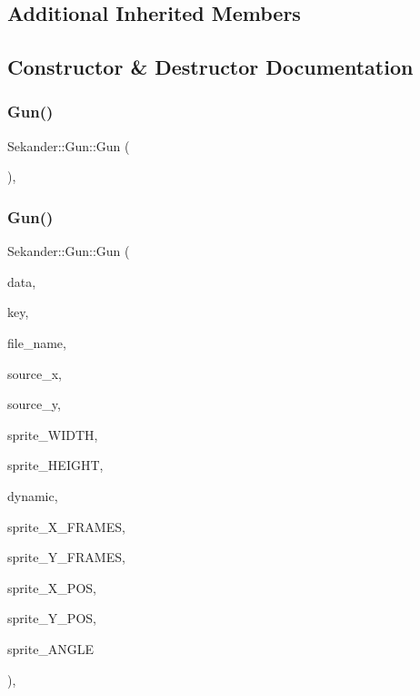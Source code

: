 \subsection*{Additional Inherited Members}


\subsection{Constructor \& Destructor Documentation}
\mbox{\label{classSekander_1_1Gun_a576c17046ba8d7bfca10333695668302}} 
\subsubsection{\texorpdfstring{Gun()}{Gun()}\hspace{0.1cm}{\footnotesize\ttfamily [1/2]}}
{\footnotesize\ttfamily Sekander\+::\+Gun\+::\+Gun (\begin{DoxyParamCaption}{ }\end{DoxyParamCaption})\hspace{0.3cm}{\ttfamily [inline]}, {\ttfamily [explicit]}}

\mbox{\label{classSekander_1_1Gun_a0027f58d8ff9eb4b97bd48c5af3aa3f0}} 
\subsubsection{\texorpdfstring{Gun()}{Gun()}\hspace{0.1cm}{\footnotesize\ttfamily [2/2]}}
{\footnotesize\ttfamily Sekander\+::\+Gun\+::\+Gun (\begin{DoxyParamCaption}\item[{\hyperlink{namespaceSekander_a1d69b002ba2d23020901c28f0def5e16}{Game\+Data\+Ref}}]{data,  }\item[{std\+::string}]{key,  }\item[{std\+::string}]{file\+\_\+name,  }\item[{int}]{source\+\_\+x,  }\item[{int}]{source\+\_\+y,  }\item[{int}]{sprite\+\_\+\+W\+I\+D\+TH,  }\item[{int}]{sprite\+\_\+\+H\+E\+I\+G\+HT,  }\item[{bool}]{dynamic,  }\item[{int}]{sprite\+\_\+\+X\+\_\+\+F\+R\+A\+M\+ES,  }\item[{int}]{sprite\+\_\+\+Y\+\_\+\+F\+R\+A\+M\+ES,  }\item[{float}]{sprite\+\_\+\+X\+\_\+\+P\+OS,  }\item[{float}]{sprite\+\_\+\+Y\+\_\+\+P\+OS,  }\item[{float}]{sprite\+\_\+\+A\+N\+G\+LE }\end{DoxyParamCaption})\hspace{0.3cm}{\ttfamily [inline]}, {\ttfamily [explicit]}}



